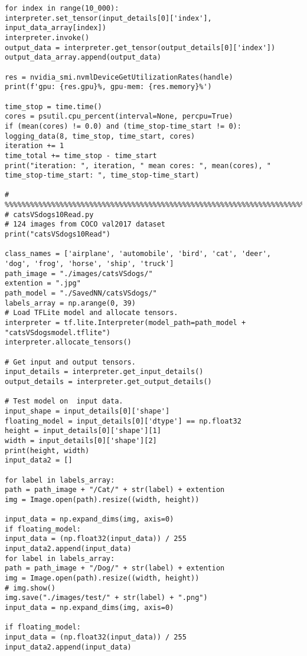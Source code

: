 \begin{lstlisting}
for index in range(10_000):
interpreter.set_tensor(input_details[0]['index'], input_data_array[index])
interpreter.invoke()
output_data = interpreter.get_tensor(output_details[0]['index'])
output_data_array.append(output_data)

res = nvidia_smi.nvmlDeviceGetUtilizationRates(handle)
print(f'gpu: {res.gpu}%, gpu-mem: {res.memory}%')

time_stop = time.time()
cores = psutil.cpu_percent(interval=None, percpu=True)
if (mean(cores) != 0.0) and (time_stop-time_start != 0):
logging_data(8, time_stop, time_start, cores)
iteration += 1
time_total += time_stop - time_start
print("iteration: ", iteration, " mean cores: ", mean(cores), " time_stop-time_start: ", time_stop-time_start)

# %%%%%%%%%%%%%%%%%%%%%%%%%%%%%%%%%%%%%%%%%%%%%%%%%%%%%%%%%%%%%%%%%%%%%%%%%%%%%%%%%%%%%%%
# catsVSdogs10Read.py
# 124 images from COCO val2017 dataset
print("catsVSdogs10Read")

class_names = ['airplane', 'automobile', 'bird', 'cat', 'deer',
'dog', 'frog', 'horse', 'ship', 'truck']
path_image = "./images/catsVSdogs/"
extention = ".jpg"
path_model = "./SavedNN/catsVSdogs/"
labels_array = np.arange(0, 39)
# Load TFLite model and allocate tensors.
interpreter = tf.lite.Interpreter(model_path=path_model + "catsVSdogsmodel.tflite")
interpreter.allocate_tensors()

# Get input and output tensors.
input_details = interpreter.get_input_details()
output_details = interpreter.get_output_details()

# Test model on  input data.
input_shape = input_details[0]['shape']
floating_model = input_details[0]['dtype'] == np.float32
height = input_details[0]['shape'][1]
width = input_details[0]['shape'][2]
print(height, width)
input_data2 = []

for label in labels_array:
path = path_image + "/Cat/" + str(label) + extention
img = Image.open(path).resize((width, height))

input_data = np.expand_dims(img, axis=0)
if floating_model:
input_data = (np.float32(input_data)) / 255
input_data2.append(input_data)
for label in labels_array:
path = path_image + "/Dog/" + str(label) + extention
img = Image.open(path).resize((width, height))
# img.show()
img.save("./images/test/" + str(label) + ".png")
input_data = np.expand_dims(img, axis=0)

if floating_model:
input_data = (np.float32(input_data)) / 255
input_data2.append(input_data)



\end{lstlisting}
